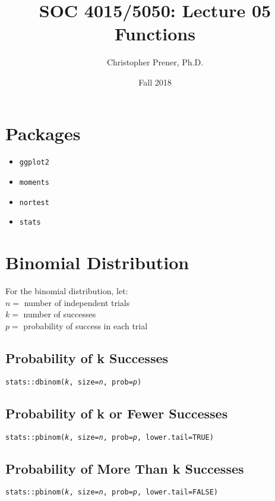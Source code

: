 \documentclass{tufte-handout}
\title{SOC 4015/5050: Lecture 05 Functions}
\author{Christopher Prener, Ph.D.}
\date{Fall 2018}
\newenvironment{subs}
  {\adjustwidth{3em}{0pt}}
  {\endadjustwidth}
\begin{document}
\maketitle %

\vspace{5mm}
\section{Packages}
\begin{itemize}
\item \texttt{ggplot2}
\item \texttt{moments}
\item \texttt{nortest}
\item \texttt{stats}
\end{itemize}

\vspace{5mm}
\section{Binomial Distribution}
For the binomial distribution, let: \\
\noindent $n =$ number of independent trials \\
\noindent $k =$ number of successes \\
\noindent $p =$ probability of success in each trial

\begin{subs}

\vspace{3mm}
\subsection{Probability of k Successes}
\noindent \texttt{stats::}{\color{red}\texttt{dbinom}}\texttt{(\textit{k}, size=\textit{n}, prob=\textit{p})}\\

\vspace{3mm}
\subsection{Probability of k or Fewer Successes}
\noindent \texttt{stats::}{\color{red}\texttt{pbinom}}\texttt{(\textit{k}, size=\textit{n}, prob=\textit{p}, lower.tail=TRUE)}\\

\vspace{3mm}
\subsection{Probability of More Than k Successes}
\noindent \texttt{stats::}{\color{red}\texttt{pbinom}}\texttt{(\textit{k}, size=\textit{n}, prob=\textit{p}, lower.tail=FALSE)}\\

\end{subs}
\end{document}
